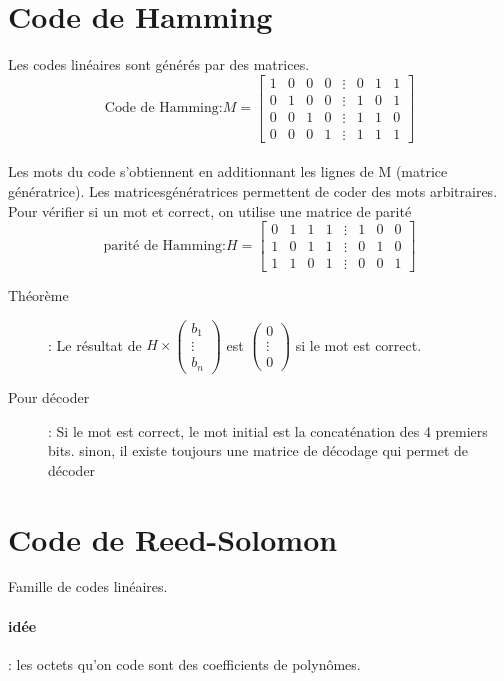 \documentclass[10pt,a4paper]{article}
\begin{document}
\section{Code de Hamming}
	Les codes linéaires sont générés par des matrices.
	\[\text{Code de Hamming:}  M = \left[\begin{matrix}
	1&0&0&0&\vdots&0&1&1\\
	0&1&0&0&\vdots&1&0&1\\
	0&0&1&0&\vdots&1&1&0\\
	0&0&0&1&\vdots&1&1&1
	\end{matrix}\right]\]\\
	Les mots du code s'obtiennent en additionnant les lignes de M (matrice génératrice). Les matricesgénératrices permettent de coder des mots arbitraires.\\
	Pour vérifier si un mot et correct, on utilise une matrice de parité
	\[\text{parité de Hamming:}H=\left[\begin{matrix}
	0&1&1&1&\vdots&1&0&0\\
	1&0&1&1&\vdots&0&1&0\\
	1&1&0&1&\vdots&0&0&1
	\end{matrix}\right]\]
	\begin{description}
		\item[Théorème]: Le résultat de $\displaystyle H\times\left(\begin{matrix}b_1\\ \vdots\\b_n\end{matrix}\right)$ est $\displaystyle\left(\begin{matrix}0\\ \vdots\\ 0\end{matrix}\right)$ si le mot est correct.
		\item[Pour décoder]: Si le mot est correct, le mot initial est la concaténation des 4 premiers bits. sinon, il existe toujours une matrice de décodage qui permet de décoder
	\end{description}
\section{Code de Reed-Solomon}
	Famille de codes linéaires.
	\paragraph{idée}: les octets qu'on code sont des coefficients de polynômes.
\end{document}
